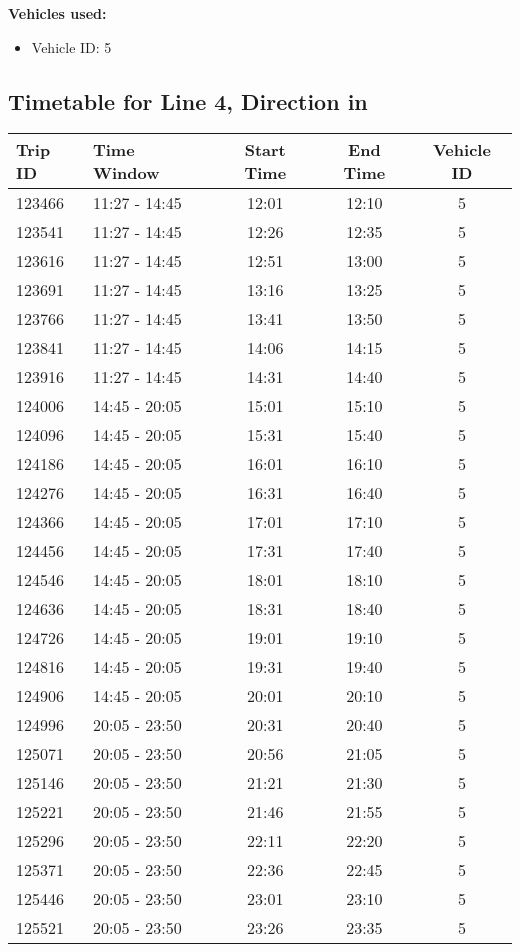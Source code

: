 \documentclass{article}
\begin{document}
\textbf{Vehicles used:}
\begin{itemize}
  \item Vehicle ID: 5
\end{itemize}

\subsection*{Timetable for Line 4, Direction in}
\begin{tabular}{llccc}
\toprule
Trip ID & Time Window & Start Time & End Time & Vehicle ID \\
\midrule
123466 & 11:27 - 14:45 & 12:01 & 12:10 & 5 \\
123541 & 11:27 - 14:45 & 12:26 & 12:35 & 5 \\
123616 & 11:27 - 14:45 & 12:51 & 13:00 & 5 \\
123691 & 11:27 - 14:45 & 13:16 & 13:25 & 5 \\
123766 & 11:27 - 14:45 & 13:41 & 13:50 & 5 \\
123841 & 11:27 - 14:45 & 14:06 & 14:15 & 5 \\
123916 & 11:27 - 14:45 & 14:31 & 14:40 & 5 \\
124006 & 14:45 - 20:05 & 15:01 & 15:10 & 5 \\
124096 & 14:45 - 20:05 & 15:31 & 15:40 & 5 \\
124186 & 14:45 - 20:05 & 16:01 & 16:10 & 5 \\
124276 & 14:45 - 20:05 & 16:31 & 16:40 & 5 \\
124366 & 14:45 - 20:05 & 17:01 & 17:10 & 5 \\
124456 & 14:45 - 20:05 & 17:31 & 17:40 & 5 \\
124546 & 14:45 - 20:05 & 18:01 & 18:10 & 5 \\
124636 & 14:45 - 20:05 & 18:31 & 18:40 & 5 \\
124726 & 14:45 - 20:05 & 19:01 & 19:10 & 5 \\
124816 & 14:45 - 20:05 & 19:31 & 19:40 & 5 \\
124906 & 14:45 - 20:05 & 20:01 & 20:10 & 5 \\
124996 & 20:05 - 23:50 & 20:31 & 20:40 & 5 \\
125071 & 20:05 - 23:50 & 20:56 & 21:05 & 5 \\
125146 & 20:05 - 23:50 & 21:21 & 21:30 & 5 \\
125221 & 20:05 - 23:50 & 21:46 & 21:55 & 5 \\
125296 & 20:05 - 23:50 & 22:11 & 22:20 & 5 \\
125371 & 20:05 - 23:50 & 22:36 & 22:45 & 5 \\
125446 & 20:05 - 23:50 & 23:01 & 23:10 & 5 \\
125521 & 20:05 - 23:50 & 23:26 & 23:35 & 5 \\
\bottomrule
\end{tabular}
\end{document}
